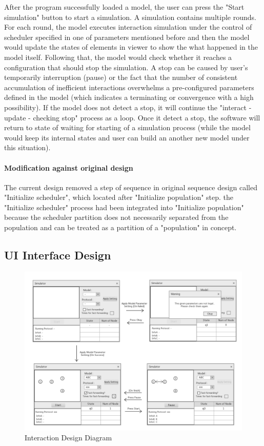 \par\noindent
After the program successfully loaded a model, the user can press the "Start simulation"
button to start a simulation. A simulation contains multiple rounds. For each round,
the model executes interaction simulation under the control of scheduler specified in one
of parameters mentioned before and then the model would update the states of elements
 in viewer to show the what happened in the model itself. Following that, the model would
 check whether it reaches a configuration that should stop the simulation. A stop can be caused
 by user's temporarily interruption (pause) or the fact that the number of consistent accumulation of
 inefficient interactions overwhelms a pre-configured parameters defined in the model (which indicates
 a terminating or convergence with a high possibility). If the model does not detect a stop,
 it will continue the "interact - update - checking stop" process as a loop. Once it detect a
 stop, the software will return to state of waiting for starting of a simulation process
 (while the model would keep its internal states and user can build an another new model under this situation).

 \paragraph{Modification against original design}
The current design removed a step of sequence in original sequence design called "Initialize scheduler", which located after "Initialize population" step.
the "Initialize scheduler" process had been integrated into "Initialize population" because
the scheduler partition does not necessarily separated from the population and can be treated as a partition of a "population" in concept.

\subsection{UI Interface Design}
\begin{figure}[H]
\begin{center}
\includegraphics[width =\textwidth]{context/diagram/interface.pdf}
\caption{Interaction Design Diagram}
\label{intefaceG}
\end{center}
\end{figure}

